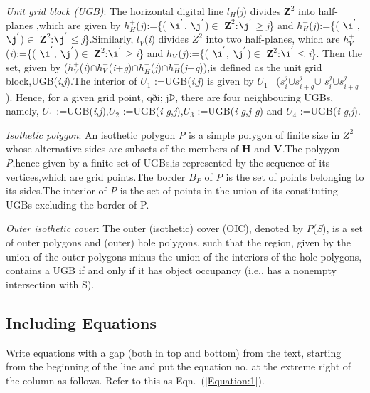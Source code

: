 \documentclass[12pt]{article}
\begin{document}
\textit{Unit grid block (UGB)}: The horizontal digital line ${\textit{l}}_H$(\textit{j}) divides $\textbf{Z}^2$ into half-planes ,which are given by  \textit{$h_H^{+}$}(\textit{j}):=\{(\textit{ $\i^{'}$},\textit{ $\j^{'}$})$\in$ $\textbf{Z}^2$:\textit{$\j^{'}$}$\geq$\textit{j}\} and  \textit{$h_H^{-}$}(\textit{j}):=\{(\textit{ $\i^{'}$},\textit{ $\j^{'}$})$\in$ $\textbf{Z}^2$:\textit{$\j^{'}$}$\leq$\textit{j}\}.Similarly, ${\textit{l}}_V$(\textit{i}) divides \textbf{$Z^{2}$} into two half-planes, which are \textit{$h_V^{+}$}(\textit{i}):=\{(\textit{ $\i^{'}$},\textit{ $\j^{'}$})$\in$ $\textbf{Z}^2$:\textit{$\i^{'}$}$\geq$\textit{i}\} and  \textit{$h_V^{-}$}(\textit{j}):=\{(\textit{ $\i^{'}$},\textit{ $\j^{'}$})$\in$ $\textbf{Z}^2$:\textit{$\i^{'}$}$\leq$\textit{i}\}. Then the set, given by (\textit{$h_V^{+}$}(\textit{i})$\cap$\textit{$h_V^{-}$}(\textit{i}+\textit{g})$\cap$\textit{$h_H^{+}$}(\textit{j})$\cap$\textit{$h_H^{-}$}(\textit{j}+\textit{g})),is defined as the unit grid block,UGB(\textit{i},\textit{j}).The interior of \textit{$U_{1}$} :=UGB(\textit{i},\textit{j}) is given by \textit{$U_{1}$} \ (\textit{$s_{i}^{j}$}$\cup$\textit{$s_{i+g}^{j}$}$\cup$ \textit{$s_{i}^{j}$}$\cup$\textit{$s_{i+g}^{j}$}). Hence, for a given grid point, qði; jÞ, there are four neighbouring UGBs, namely, \textit{$U_{1}$} :=UGB(\textit{i},\textit{j}),\textit{$U_{2}$} :=UGB(\textit{i-g},\textit{j}),\textit{$U_{3}$} :=UGB(\textit{i-g},\textit{j-g}) and \textit{$U_{4}$} :=UGB(\textit{i-g},\textit{j}).
\break
 

\textit{Isothetic polygon}: An isothetic polygon \textit{P} is a simple polygon of finite size in \textbf{$Z^{2}$} whose alternative sides are subsets of the members of \textbf{H} and \textbf{V}.The polygon \textit{P},hence given by a finite set of UGBs,is represented by the sequence of its vertices,which are grid points.The border \textit{$B_{P}$} of \textit{P} is the set of points belonging to its sides.The interior of \textit{P} is the set of points in the union of its constituting UGBs excluding the border of P.
\break


\textit{Outer isothetic cover}: The outer (isothetic) cover (OIC), denoted by $\bar{P}$(\textit{S}), is a set of outer polygons and (outer) hole polygons, such that the region, given by the union of the outer polygons minus the union of the interiors of the hole polygons, contains a UGB if and only if it has object occupancy (i.e., has a nonempty intersection with S).
\break


\subsection{Including Equations}
Write equations with a gap (both in top and bottom) from the text, starting from the beginning of the line and put the equation no. at the extreme right of the column as follows. Refer to this as Eqn.~(\ref{Equation:1}).
\end{document}
